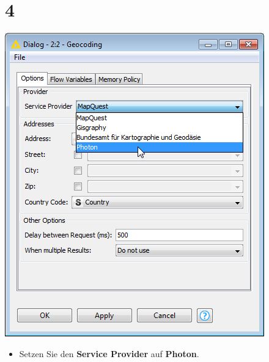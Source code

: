 \documentclass[10pt]{beamer}
\begin{document}
\section{4}
\begin{frame}
	\begin{center}
  		\includegraphics[height=0.6\textheight]{4.png}
	\end{center}
	\begin{itemize}
        \item Setzen Sie den \textbf{Service Provider} auf \textbf{Photon}.
	\end{itemize}
\end{frame}
\end{document}
